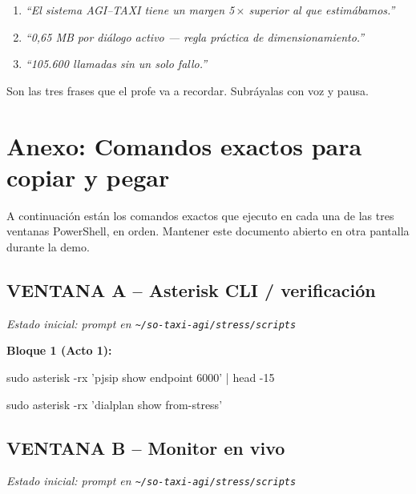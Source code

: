 \documentclass[11pt,letterpaper]{article}
\begin{document}
\vspace{0.6em}
\begin{frasesclave}
\begin{enumerate}[leftmargin=1.5em, itemsep=0.3em]
  \item \textit{``El sistema AGI--TAXI tiene un margen 5\,$\times$ superior al que estim\'abamos.''}
  \item \textit{``0,65 MB por di\'alogo activo --- regla pr\'actica de dimensionamiento.''}
  \item \textit{``105.600 llamadas sin un solo fallo.''}
\end{enumerate}
\vspace{0.3em}
{\small Son las tres frases que el profe va a recordar. Subr\'ayalas con voz y pausa.}
\end{frasesclave}

\newpage

\section*{Anexo: Comandos exactos para copiar y pegar}

A continuaci\'on est\'an los comandos exactos que ejecuto en cada una de las tres ventanas PowerShell, en orden. Mantener este documento abierto en otra pantalla durante la demo.

\subsection*{\color{azul} VENTANA A -- Asterisk CLI / verificaci\'on}

\textit{Estado inicial: prompt en \texttt{\textasciitilde/so-taxi-agi/stress/scripts}}

\textbf{Bloque 1 (Acto 1):}
\begin{comando}
sudo asterisk -rx 'pjsip show endpoint 6000' | head -15

sudo asterisk -rx 'dialplan show from-stress'
\end{comando}

\subsection*{\color{verde} VENTANA B -- Monitor en vivo}

\textit{Estado inicial: prompt en \texttt{\textasciitilde/so-taxi-agi/stress/scripts}}
\end{document}
